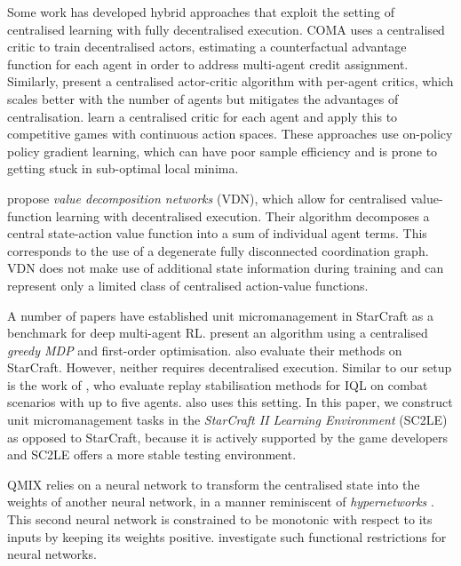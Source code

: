 \documentclass{article}
\begin{document}
Some work has developed hybrid approaches that exploit the setting of 
centralised learning with fully decentralised execution. COMA 
\cite{foerster_counterfactual_2017} uses a centralised critic to train 
decentralised actors, estimating a counterfactual advantage function for each 
agent in order to address multi-agent credit assignment. Similarly, 
\citet{gupta_cooperative_2017} present a centralised actor-critic algorithm 
with per-agent critics, which scales better with the number of agents but mitigates the
advantages of centralisation. \citet{lowe_multi-agent_2017} learn a 
centralised critic for each agent and apply this to competitive games with 
continuous action spaces. These approaches use on-policy policy gradient 
learning, which can have poor sample efficiency and is prone to getting stuck 
in sub-optimal local minima.

\citet{sunehag_value-decomposition_2017} propose \emph{value decomposition 
networks} (VDN), which allow for centralised value-function learning with 
decentralised execution. Their algorithm decomposes a central 
state-action value function into a sum of individual agent terms. This corresponds to 
the use of a degenerate fully disconnected coordination graph. VDN does not make 
use of additional state information during training and can represent only a
 limited class of centralised action-value functions.
 
A number of papers have established unit micromanagement in StarCraft as a benchmark for deep multi-agent RL. 
\citet{usunier_episodic_2016} present an algorithm using a centralised \textit{greedy MDP} and first-order optimisation. \citet{peng_multiagent_2017} also evaluate their methods on StarCraft. However, neither requires decentralised execution. 
Similar to our setup is the work of \citet{foerster_stabilising_2017}, who evaluate replay stabilisation methods for IQL on combat scenarios with up to five agents. \citet{foerster_counterfactual_2017} also uses this setting. 
In this paper, we construct unit micromanagement tasks in the \textit{StarCraft 
II Learning Environment} (SC2LE) \cite{vinyals_starcraft_2017} as opposed to 
StarCraft, because it is actively supported by the game developers and SC2LE offers a more stable testing environment. 

QMIX relies on a neural network to transform the centralised state into the 
weights of another neural network, in a manner reminiscent of 
\emph{hypernetworks} \citep{ha_hypernetworks_2016}. This second neural network 
is constrained to be monotonic with respect to its inputs by keeping its 
weights positive. \citet{Dugas_2009} investigate such functional restrictions 
for neural networks.
\end{document}
